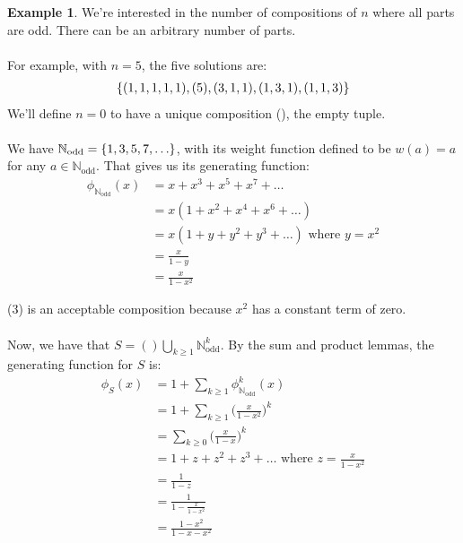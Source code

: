 \documentclass[]{article}
\theoremstyle{definition}
\newtheorem{ex}{Example}[section]
\DeclarePairedDelimiter{\set}{\lbrace}{\rbrace}
\begin{document}
				\begin{ex}
					We're interested in the number of compositions of $n$ where all parts are odd. There can be an arbitrary number of parts.
					\\ \\
					For example, with $n = 5$, the five solutions are:
					\begin{align*}
						\set{(1, 1, 1, 1, 1), (5), (3, 1, 1), (1, 3, 1), (1, 1, 3) }
					\end{align*}
					We'll define $n = 0$ to have a unique composition (), the empty tuple.
					\\ \\
					We have $\mathbb{N}_{\text{odd}} = \set{1, 3, 5, 7, \ldots}$, with its weight function defined to be $w(a) = a$ for any $a \in \mathbb{N}_{\text{odd}}$. That gives us its generating function:
					\setcounter{equation}{0}
					\begin{align}
						\phi_{\mathbb{N}_{\text{odd}}}(x) &= x + x^3 + x^5 + x^7 + \ldots \\
						&= x(1 + x^2 + x^4 + x^6 + \ldots) \\
						&= x(1 + y + y^2 + y^3 + \ldots) \text{ where } y = x^2 \\
						&= \frac{x}{1 - y} \\
						&= \frac{x}{1 - x^2}
					\end{align}

					(3) is an acceptable composition because $x^2$ has a constant term of zero.
					\\ \\
					Now, we have that $\displaystyle S = () \bigcup_{k \ge 1} \mathbb{N}_{\text{odd}}^k$. By the sum and product lemmas, the generating function for $S$ is:
					\setcounter{equation}{0}
					\begin{align}
						\phi_S(x) &= 1 + \sum_{k \ge 1} \phi_{\mathbb{N}_{\text{odd}}}^k(x) \\
						&= 1 + \sum_{k \ge 1} \bigg( \frac{x}{1 - x^2} \bigg)^k \\
						&= \sum_{k \ge 0} \bigg( \frac{x}{1 - x} \bigg)^k \\
						&= 1 + z + z^2 + z^3 + \ldots \text{ where } z = \frac{x}{1 - x^2} \\
						&= \frac{1}{1 - z} \\
						&= \frac{1}{1 - \frac{x}{1 - x^2}} \\
						&= \frac{1 - x^2}{1 - x - x^2}
					\end{align}


\end{ex}
\end{document}
